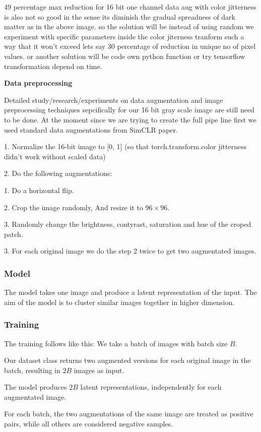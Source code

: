 \documentclass[12pt,twoside,a4paper,parskip]{scrbook} %
\begin{document}
49 percentage max reduction for 16 bit one channel data aug with color jitterness  is also not so good in the sense its diminish the gradual spreadness of dark matter as in the above image. so the solution will be instead of using random we experiment with specific parameters inside the color jiterness tranform such a way that it won't exceed lets say 30 percentage of reduction in unique no of pixel values.
or another solution will be code own python function or try tensorflow transformation depend on time.

\textbf{Data preprocessing}

Detailed study/research/experiments on data augmentation and image preprocessing techniques sepcifically for our 16 bit gray scale image are still need to be done.
At the moment since we are trying to create the full pipe line first we used standard data augmentations from SimCLR paper.

1. Normalize the 16-bit image to [0, 1] (so that torch.transform.color jitterness didn't work without scaled data)

2. Do the following augmentations:

      1. Do a horizontal flip.

      2. Crop the image randomly, And resize it to $96\times 96$.

      3. Randomly change the brightness, contyrast, saturation and hue of the croped patch.

3. For each original image we do the step 2 twice to get two augmentated images.

\subsubsection{Model}
The model takes one image and produce a latent representation of the input. The aim of the model is to cluster similar images together in higher dimension.
\subsubsection{Training}
The training follows like this:
  We take a batch of images with batch size $B$.

  Our dataset class returns two augmented versions for each original image in the batch, resulting in $2B$ images as input.

  The model produces $2B$ latent representations, independently for each augmentated image.

  For each batch, the two augmentations of the same image are treated as positive pairs, while all others are considered negative samples.
\end{document}

